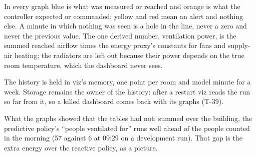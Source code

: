 In every graph blue is what was measured or reached and orange is what the
controller expected or commanded; yellow and red mean an alert and nothing
else. A minute in which nothing was seen is a hole in the line, never a zero
and never the previous value. The one derived number, ventilation power, is
the summed reached airflow times the energy proxy's constants for fans and
supply-air heating; the radiators are left out because their power depends on
the true room temperature, which the dashboard never sees.

The history is held in viz's memory, one point per room and model minute for a
week. Storage remains the owner of the history: after a restart viz reads the
run so far from it, so a killed dashboard comes back with its graphs (T-39).


What the graphs showed that the tables had not: summed over the building, the
predictive policy's ``people ventilated for'' runs well ahead of the people
counted in the morning (57 against 6 at 09:29 on a development run). That gap
is the extra energy over the reactive policy, as a picture.
